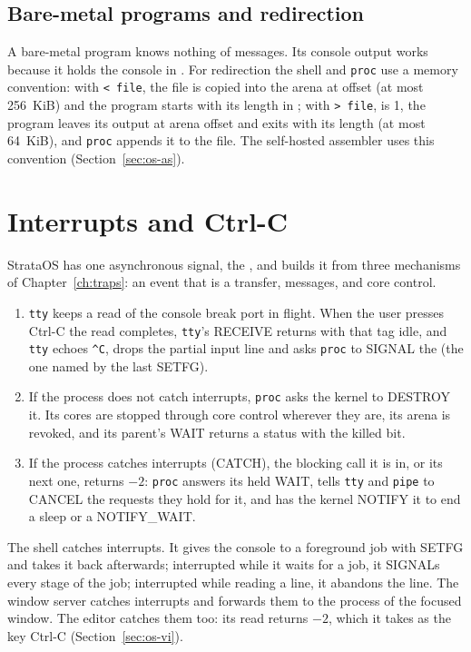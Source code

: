 \subsection{Bare-metal programs and redirection}
A bare-metal program knows nothing of messages. Its console output works because it holds the console
in . For redirection the shell and \texttt{proc} use a memory convention: with \texttt{<
file}, the file is copied into the arena at offset  (at most 256~KiB) and the program starts
with its length in ; with \texttt{> file},  is 1, the program leaves its output at
arena offset  and exits with its length (at most 64~KiB), and \texttt{proc} appends it to the
file. The self-hosted assembler uses this convention (Section~\ref{sec:os-as}).

\section{Interrupts and Ctrl-C}\label{sec:os-break}

StrataOS has one asynchronous signal, the , and builds it from three mechanisms of
Chapter~\ref{ch:traps}: an event that is a transfer, messages, and core control.

\begin{enumerate}
\item \texttt{tty} keeps a read of the console break port in flight. When the user presses Ctrl-C the
  read completes, \texttt{tty}'s RECEIVE returns with that tag idle, and \texttt{tty} echoes
  \texttt{\textasciicircum C}, drops the partial input line and asks \texttt{proc} to SIGNAL the
   (the one named by the last SETFG).
\item If the process does not catch interrupts, \texttt{proc} asks the kernel to DESTROY it. Its
  cores are stopped through core control wherever they are, its arena is revoked, and its parent's
  WAIT returns a status with the killed bit.
\item If the process catches interrupts (CATCH), the blocking call it is in, or its next one, returns
  $-2$: \texttt{proc} answers its held WAIT, tells \texttt{tty} and \texttt{pipe} to CANCEL the
  requests they hold for it, and has the kernel NOTIFY it to end a sleep or a NOTIFY\_WAIT.
\end{enumerate}

The shell catches interrupts. It gives the console to a foreground job with SETFG and takes it back
afterwards; interrupted while it waits for a job, it SIGNALs every stage of the job; interrupted while
reading a line, it abandons the line. The window server catches interrupts and forwards them to the
process of the focused window. The editor catches them too: its read returns $-2$, which it takes as
the key Ctrl-C (Section~\ref{sec:os-vi}).

